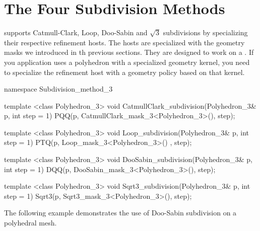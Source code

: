 



\section{The Four Subdivision Methods}
 supports Catmull-Clark, Loop, 
Doo-Sabin and $\sqrt{3}$ subdivisions by specializing
their respective refinement hosts. The hosts are specialized with
the geometry masks we introduced in th previous sections. They
are designed to work on a . If you application 
uses a polyhedron with a specialized geometry kernel, you need to 
specialize the refinement host with a geometry policy 
based on that kernel.

\begin{ccExampleCode}
namespace Subdivision_method_3 {
  template <class Polyhedron_3>
  void CatmullClark_subdivision(Polyhedron_3& p, int step = 1) {
    PQQ(p, CatmullClark_mask_3<Polyhedron_3>(), step);
  }

  template <class Polyhedron_3>
  void Loop_subdivision(Polyhedron_3& p, int step = 1) {
    PTQ(p, Loop_mask_3<Polyhedron_3>() , step);
  }

  template <class Polyhedron_3>
  void DooSabin_subdivision(Polyhedron_3& p, int step = 1) {
    DQQ(p, DooSabin_mask_3<Polyhedron_3>(), step);
  }

  template <class Polyhedron_3>
  void Sqrt3_subdivision(Polyhedron_3& p, int step = 1) {
    Sqrt3(p, Sqrt3_mask_3<Polyhedron_3>(), step);
  }
}
\end{ccExampleCode}

The following example demonstrates the use of Doo-Sabin subdivision 
on a polyhedral mesh.

